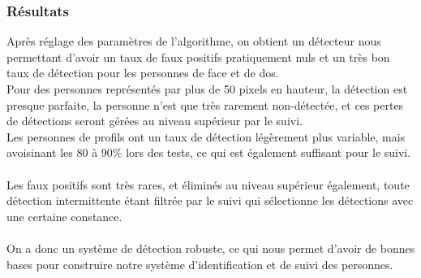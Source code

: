 \documentclass[12pt]{article}
\begin{document}
\subsubsection{Résultats}
Après réglage des paramètres de l'algorithme, on obtient un détecteur nous permettant d'avoir un taux de faux positifs pratiquement nuls et un très bon taux de détection pour les personnes de face et de dos.\\
Pour des personnes représentés par plus de 50 pixels en hauteur, la détection est presque parfaite, la personne n'est que très rarement non-détectée, et ces pertes de détections seront gérées au niveau supérieur par le suivi.\\
Les personnes de profils ont un taux de détection légèrement plus variable, mais avoisinant les 80 à 90\% lors des tests, ce qui est également suffisant pour le suivi.\\
\\
Les faux positifs sont très rares, et éliminés au niveau supérieur également, toute détection intermittente étant filtrée par le suivi qui sélectionne les détections avec une certaine constance.\\
\\
On a donc un système de détection robuste, ce qui nous permet d'avoir de bonnes bases pour construire notre système d'identification et de suivi des personnes.
\end{document}
